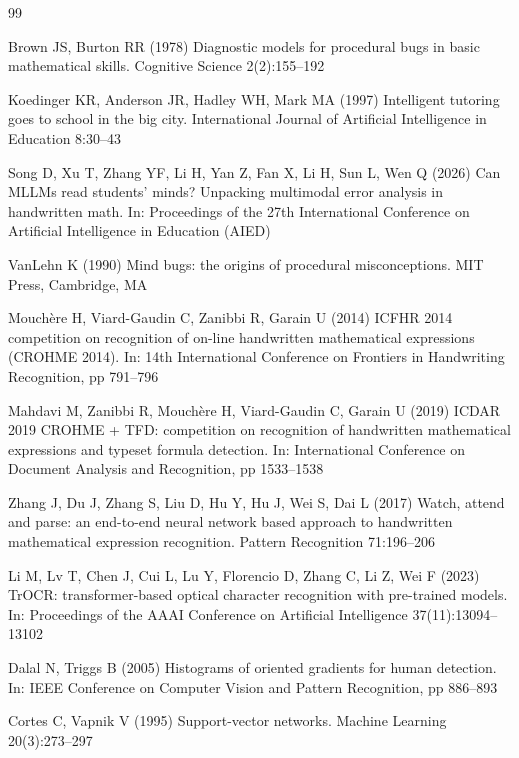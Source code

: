 \documentclass[runningheads]{llncs}
\begin{document}
\begin{thebibliography}{99}

Brown JS, Burton RR (1978) Diagnostic models for procedural bugs in basic mathematical skills. Cognitive Science 2(2):155--192

Koedinger KR, Anderson JR, Hadley WH, Mark MA (1997) Intelligent tutoring goes to school in the big city. International Journal of Artificial Intelligence in Education 8:30--43

Song D, Xu T, Zhang YF, Li H, Yan Z, Fan X, Li H, Sun L, Wen Q (2026) Can MLLMs read students' minds? Unpacking multimodal error analysis in handwritten math. In: Proceedings of the 27th International Conference on Artificial Intelligence in Education (AIED)

VanLehn K (1990) Mind bugs: the origins of procedural misconceptions. MIT Press, Cambridge, MA

Mouch\`ere H, Viard-Gaudin C, Zanibbi R, Garain U (2014) ICFHR 2014 competition on recognition of on-line handwritten mathematical expressions (CROHME 2014). In: 14th International Conference on Frontiers in Handwriting Recognition, pp 791--796

Mahdavi M, Zanibbi R, Mouch\`ere H, Viard-Gaudin C, Garain U (2019) ICDAR 2019 CROHME + TFD: competition on recognition of handwritten mathematical expressions and typeset formula detection. In: International Conference on Document Analysis and Recognition, pp 1533--1538

Zhang J, Du J, Zhang S, Liu D, Hu Y, Hu J, Wei S, Dai L (2017) Watch, attend and parse: an end-to-end neural network based approach to handwritten mathematical expression recognition. Pattern Recognition 71:196--206

Li M, Lv T, Chen J, Cui L, Lu Y, Florencio D, Zhang C, Li Z, Wei F (2023) TrOCR: transformer-based optical character recognition with pre-trained models. In: Proceedings of the AAAI Conference on Artificial Intelligence 37(11):13094--13102

Dalal N, Triggs B (2005) Histograms of oriented gradients for human detection. In: IEEE Conference on Computer Vision and Pattern Recognition, pp 886--893

Cortes C, Vapnik V (1995) Support-vector networks. Machine Learning 20(3):273--297


\end{thebibliography}
\end{document}
